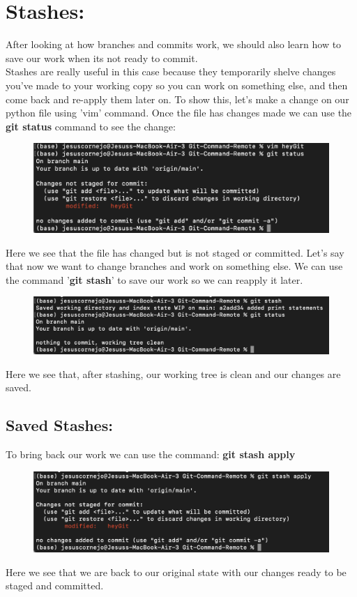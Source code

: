 \documentclass{article}
\begin{document}
\newpage

\section{Stashes:}
After looking at how branches and commits work, we should also learn how to save our work when its not ready to commit.\\
Stashes are really useful in this case because they temporarily shelve changes you've made to your working copy so you can work on something else, and then come back and re-apply them later on. To show this, let's make a change on our python file using 'vim' command. Once the file has changes made we can use the \textbf{git status} command to see the change:

\begin{figure}[h]
\includegraphics[scale = 0.7]{screenshots/sc16.png}
\centering
\end{figure}

Here we see that the file has changed but is not staged or committed. Let's say that now we want to change branches and work on something else. We can use the command '\textbf{git stash}' to save our work so we can reapply it later.\\

\begin{figure}[h]
\includegraphics[scale = 0.7]{screenshots/sc17.png}
\centering
\end{figure}

Here we see that, after stashing, our working tree is clean and our changes are saved.

\newpage

\subsection{Saved Stashes:}
To bring back our work we can use the command: \textbf{git stash apply}\\

\begin{figure}[h]
\includegraphics[scale = 0.7]{screenshots/sc18.png}
\centering
\end{figure}

Here we see that we are back to our original state with our changes ready to be staged and committed.
\end{document}

